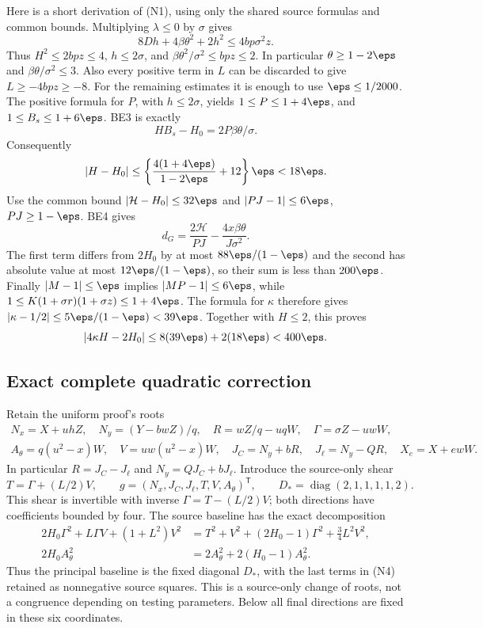 Here is a short derivation of (N1), using only the shared source
formulas and common bounds. Multiplying $\lambda\le0$ by $\sigma$
gives
\[
 8Dh+4\beta\theta^2+2h^2\le4bp\sigma^2z.
\]
Thus $H^2\le2bpz\le4$, $h\le2\sigma$, and
$\beta\theta^2/\sigma^2\le bpz\le2$. In particular
$\theta\ge1-2\eps$ and $\beta\theta/\sigma^2\le3$.
Also every positive term in $L$ can be discarded to give
$L\ge-4bpz\ge-8$.
For the remaining estimates it is enough to use $\eps\le1/2000$.
The positive formula for $P$, with $h\le2\sigma$, yields
$1\le P\le1+4\eps$, and $1\le B_s\le1+6\eps$.
BE3 is exactly
\[
 HB_s-H_0=2P\beta\theta/\sigma.
\]
Consequently
\[
 |H-H_0|\le
 \left\{\frac{4(1+4\eps)}{1-2\eps}+12\right\}\eps
 <18\eps.
\]
Use the common bound $|\mathcal H-H_0|\le32\eps$ and
$|PJ-1|\le6\eps$, $PJ\ge1-\eps$. BE4 gives
\[
 d_G=\frac{2\mathcal H}{PJ}
             -\frac{4x\beta\theta}{J\sigma^2}.
\]
The first term differs from $2H_0$ by at most
$88\eps/(1-\eps)$ and the second has absolute value at most
$12\eps/(1-\eps)$, so their sum is less than $200\eps$.
Finally $|M-1|\le\eps$ implies $|MP-1|\le6\eps$, while
$1\le K(1+\sigma r)(1+\sigma z)\le1+4\eps$.
The formula for $\kappa$ therefore gives
$|\kappa-1/2|\le5\eps/(1-\eps)<39\eps$.
Together with $H\le2$, this proves
\[
 |4\kappa H-2H_0|
 \le8(39\eps)+2(18\eps)<400\eps.
\]

\subsection{Exact complete quadratic correction}

Retain the uniform proof's roots
\[
\begin{gathered}
 N_x=X+uhZ,\quad N_y=(Y-bwZ)/q,\quad
 R=wZ/q-uqW,\quad \Gamma=\sigma Z-uwW,\\
 A_\theta=q(u^2-x)W,\quad V=uw(u^2-x)W,\quad
 J_C=N_y+bR,\quad J_\ell=N_y-QR,\quad X_e=X+ewW.
\end{gathered}
\]
In particular $R=J_C-J_\ell$ and $N_y=QJ_C+bJ_\ell$.
Introduce the source-only shear
\[
 T=\Gamma+(L/2)V,\qquad
 g=(N_x,J_C,J_\ell,T,V,A_\theta)^{\mathsf T},\qquad
 D_* =\operatorname{diag}(2,1,1,1,1,2).
\]
This shear is invertible with inverse $\Gamma=T-(L/2)V$;
both directions have coefficients bounded by four.
The source baseline has the exact decomposition
\[
\begin{split}
 2H_0\Gamma^2+L\Gamma V+(1+L^2)V^2
 &=T^2+V^2+(2H_0-1)\Gamma^2+\tfrac34L^2V^2,\\
 2H_0A_\theta^2&=2A_\theta^2+2(H_0-1)A_\theta^2.
\end{split}                                                   \tag{N4}
\]
Thus the principal baseline is the fixed diagonal $D_*$, with the
last terms in (N4) retained as nonnegative source squares. This is
a source-only change of roots, not a congruence depending on testing
parameters. Below all final directions are fixed in these six coordinates.

